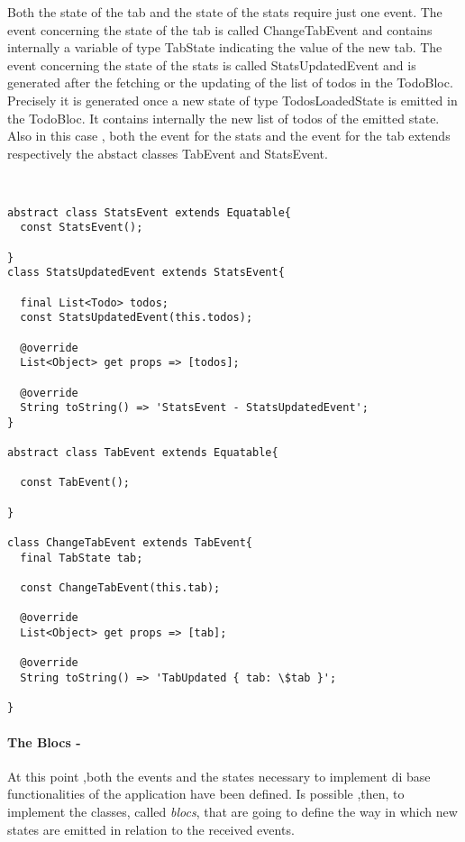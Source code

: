 Both the state of the tab and the state of the stats require just one event. The event concerning the state of the tab is called ChangeTabEvent and contains internally a variable of type TabState indicating the value of the new tab. The event concerning the state of the stats is called StatsUpdatedEvent and is generated after the fetching or the updating of the list of todos in the TodoBloc. Precisely it is generated once a new state of type TodosLoadedState is emitted in the TodoBloc. It contains internally the new list of todos of the emitted state. \\
Also in this case , both the event for the stats and the event for the tab extends respectively the abstact classes TabEvent and StatsEvent.

\begin{code}
\mbox{}
 \mbox{}
\label{code:2.14}
\begin{verbatim}


abstract class StatsEvent extends Equatable{
  const StatsEvent();

}
class StatsUpdatedEvent extends StatsEvent{

  final List<Todo> todos;
  const StatsUpdatedEvent(this.todos);

  @override
  List<Object> get props => [todos];

  @override
  String toString() => 'StatsEvent - StatsUpdatedEvent';
}

abstract class TabEvent extends Equatable{

  const TabEvent();

}

class ChangeTabEvent extends TabEvent{
  final TabState tab;

  const ChangeTabEvent(this.tab);

  @override
  List<Object> get props => [tab];

  @override
  String toString() => 'TabUpdated { tab: \$tab }';

}
\end{verbatim}
\mbox{}
\end{code}

\paragraph{The Blocs - }
\label{subpar:todo_app_bloc_core_state}

At this point ,both the events and the states necessary to implement di base functionalities of the application have been defined. Is possible ,then, to implement the classes, called \textit{blocs}, that are going to define the way in which new states are emitted in relation to the received events.


